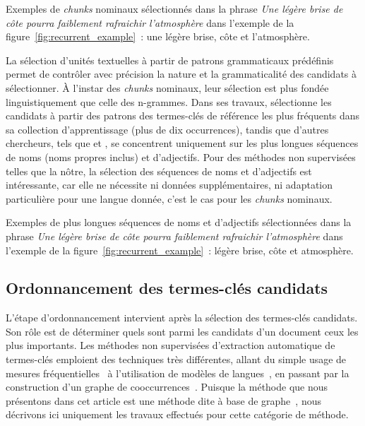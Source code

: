     Exemples de \textit{chunks} nominaux sélectionnés dans la phrase
    \textit{\og{}Une légère brise de côte pourra faiblement rafraichir
    l'atmosphère\fg{}} dans l'exemple de la figure~\ref{fig:recurrent_example}~: \og{}une légère brise\fg{},
    \og{}côte\fg{} et \og{}l'atmosphère\fg{}.

    La sélection d'unités textuelles à partir de patrons grammaticaux prédéfinis
    permet de contrôler avec précision la nature et la grammaticalité des
    candidats à sélectionner. À l'instar des \textit{chunks} nominaux, leur
    sélection est plus fondée linguistiquement que celle des n-grammes. Dans ses
    travaux,  sélectionne les candidats à
    partir des patrons des termes-clés de référence les plus fréquents dans sa
    collection d'apprentissage (plus de dix occurrences), tandis que d'autres
    chercheurs, tels que  et
    , se concentrent uniquement sur les plus
    longues séquences de noms (noms propres inclus) et d'adjectifs. Pour des
    méthodes non supervisées telles que la nôtre, la sélection des séquences de
    noms et d'adjectifs est intéressante, car elle ne nécessite ni données
    supplémentaires, ni adaptation particulière pour une langue donnée,
    c'est le cas pour les \textit{chunks} nominaux.

    Exemples de plus longues séquences de noms et d'adjectifs
    sélectionnées dans la phrase \textit{\og{}Une légère brise de côte pourra faiblement
    rafraichir l'atmosphère\fg{}} dans l'exemple de la
    figure~\ref{fig:recurrent_example}~:
    \og{}légère brise\fg{}, \og{}côte\fg{} et \og{}atmosphère\fg{}.

  \subsection{Ordonnancement des termes-clés candidats}
  \label{subsec:ordonnancement_des_termes_cles_candidats}
    L'étape d'ordonnancement intervient après la sélection des termes-clés
    candidats. Son rôle est de déterminer quels sont parmi les candidats d'un
    document ceux les plus importants.
    Les méthodes non supervisées d'extraction automatique de termes-clés
    emploient des techniques très différentes, allant du simple usage de mesures
    fréquentielles~\cite{paukkeri2010likey} à l'utilisation de modèles de
    langues~\cite{tomokiyo2003languagemodel}, en passant par la construction
    d'un graphe de cooccurrences~\cite{mihalcea2004textrank}. Puisque la méthode
    que nous présentons dans cet article est une méthode dite \og à base de
    graphe~\fg, nous décrivons ici uniquement les travaux effectués pour cette
    catégorie de méthode.

